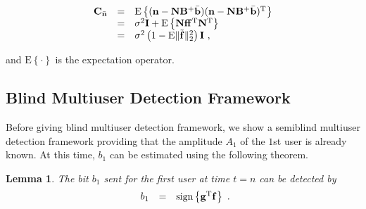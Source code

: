 \documentclass[a4paper,11pt,fleqn]{article}
\newtheorem{lemma}{Lemma}
\newcommand{\bb}{{\bf b}}
\newcommand{\bC}{{\bf C}}
\newcommand{\bg}{{\bf g}}
\newcommand{\bn}{{\bf n}}
\newcommand{\bbf}{{\bf f}}
\newcommand{\bN}{{\bf N}}
\newcommand{\bI}{{\bf I}}
\newcommand{\bB}{{\bf B}}
\begin{document}
\begin{equation}
\begin{array}{rcl}
\bC_{\bar{\bn}}&=&\mbox{E}\left\{(\bn-{\bN}\bB^{+}\bar\bb)(\bn-{\bN}\bB^{+}\bar\bb)^{\rm T}\right\}\\
&=& \sigma^{2}\bI+\mbox{E}\left\{{\bN}\bbf\bbf^{\rm T}{\bN}^{\rm T}\right\}\\
&=&\sigma^2\left(1-\mbox{E}\|\tilde{\bbf}\|_2^2\right)\bI\ ,
\end{array} \label{var_n}
\end{equation}

\noindent and $\mbox{E}\left\{\cdot\right\}$ is the expectation
operator.


\subsection{Blind Multiuser Detection Framework} Before giving
blind multiuser detection framework, we show a semiblind multiuser
detection framework providing that the amplitude $A_1$ of the
$1$st user is already known. At this time, $b_1$ can be estimated
using the following theorem.


\begin{lemma}
The bit $b_1$ sent for the first user at time $t=n$ can be
detected by
\begin{equation}
\begin{array}{rcl}
b_1 &=& \mbox{sign}\left\{\bg^{\rm T}\bbf\right\}
\end{array}.
\end{equation} \label{bn_estimation}
\end{lemma}
\end{document}
